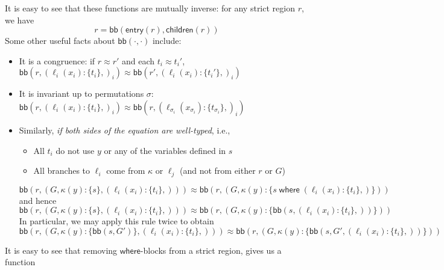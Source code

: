 \documentclass[acmsmall,screen,review]{acmart}
\newcommand{\ms}[1]{\ensuremath{\mathsf{#1}}}
\newcommand{\lto}{:}
\newcommand{\where}[2]{#1\;\ms{where}\;#2}
\newcommand{\wbranch}[3]{#1(#2) \lto \{#3\}}
\newcommand{\teqv}{\approx}
\newcommand{\toentry}[1]{\ms{entry}(#1)}
\newcommand{\todom}[1]{\ms{children}(#1)}
\newcommand{\adddom}[2]{\ms{bb}(#1, #2)}
\begin{document}
It is easy to see that these functions are mutually inverse: for any strict region $r$, we have
\begin{equation}
  r = \adddom{\toentry{r}}{\todom{r}}
\end{equation}
Some other useful facts about $\adddom{\cdot}{\cdot}$ include:
\begin{itemize}
  \item It is a congruence: if $r \teqv r'$ and each $t_i \teqv t_i'$,
  $\adddom{r}{(\wbranch{\ell_i}{x_i}{t_i},)_i} \teqv \adddom{r'}{(\wbranch{\ell_i}{x_i}{t_i'},)_i}$
  \item It is invariant up to permutations
  $\sigma$: $\adddom{r}{(\wbranch{\ell_i}{x_i}{t_i},)_i} \teqv 
    \adddom{r}{(\wbranch{\ell_{\sigma_i}}{x_{\sigma_i}}{t_{\sigma_i}},)_i}$
  \item Similarly, \emph{if both sides of the equation are well-typed}, i.e.,
  \begin{itemize}
    \item All $t_i$ do not use $y$ or any of the variables defined in $s$
    \item All branches to $\ell_i$ come from $\kappa$ or $\ell_j$ (and not from either $r$ or $G$)
  \end{itemize}
  \begin{equation}
    \adddom{r}{(G, \wbranch{\kappa}{y}{s}, (\wbranch{\ell_i}{x_i}{t_i},))} \teqv
    \adddom{r}{(G, \wbranch{\kappa}{y}{\where{s}{(\wbranch{\ell_i}{x_i}{t_i},)}})}
  \end{equation} 
  and hence
  \begin{equation}
    \adddom{r}{(G, \wbranch{\kappa}{y}{s}, (\wbranch{\ell_i}{x_i}{t_i},))} \teqv
    \adddom{r}{(G, \wbranch{\kappa}{y}{\adddom{s}{(\wbranch{\ell_i}{x_i}{t_i},)}})}
  \end{equation}
  In particular, we may apply this rule twice to obtain
  \begin{equation}
    \adddom{r}{(G, \wbranch{\kappa}{y}{\adddom{s}{G'}}, (\wbranch{\ell_i}{x_i}{t_i},))} \teqv
    \adddom{r}{(G, \wbranch{\kappa}{y}{\adddom{s}{G', (\wbranch{\ell_i}{x_i}{t_i},)}})}
    \label{eqn:pull-where}
  \end{equation}
\end{itemize}
It is easy to see that removing \ms{where}-blocks from a strict region, gives us a function
\end{document}
